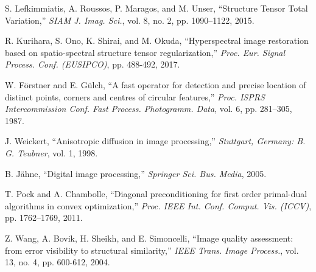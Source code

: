 \begin{thebibliography}{100}
	 S. Lefkimmiatis, A. Roussos, P. Maragos, and M. Unser, ``Structure Tensor Total Variation,'' \textit{SIAM J. Imag. Sci.}, vol. 8, no. 2, pp. 1090--1122, 2015. 
	
	 R. Kurihara, S. Ono, K. Shirai, and M. Okuda, ``Hyperspectral image restoration based on spatio-spectral structure tensor regularization,'' \textit{Proc. Eur. Signal Process. Conf. (EUSIPCO)}, pp. 488-492, 2017.
	
	 W. F{\"o}rstner and E. G{\"u}lch, ``A fast operator for detection and precise location of distinct points, corners and centres of circular features,'' \textit{Proc. ISPRS Intercommission Conf. Fast Process. Photogramm. Data}, vol. 6, pp. 281--305, 1987.
	
	 J. Weickert, ``Anisotropic diffusion in image processing,'' \textit{Stuttgart, Germany: B. G. Teubner}, vol. 1, 1998.
	
	 B. J{\"a}hne, ``Digital image processing,'' \textit{Springer Sci. Bus. Media}, 2005.
	
	 T. Pock and A. Chambolle, ``Diagonal preconditioning for first order primal-dual algorithms in convex optimization,'' \textit{Proc. IEEE Int. Conf. Comput. Vis. (ICCV)}, pp. 1762--1769, 2011.
	
	 Z. Wang, A. Bovik, H. Sheikh, and E. Simoncelli, ``Image quality assessment: from error visibility to structural similarity,'' \textit{IEEE Trans. Image Process.}, vol. 13, no. 4, pp. 600-612, 2004.
	
	
	
	
	
\end{thebibliography}